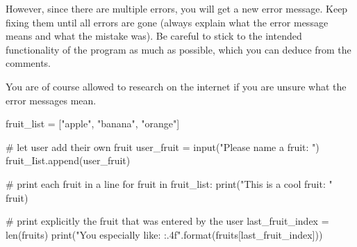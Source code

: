 \noindent However, since there are multiple errors, you will get a new error message. Keep fixing them until all errors are gone (always explain what the error message means and what the mistake was). Be careful to stick to the intended functionality of the program as much as possible, which you can deduce from the comments.

\vspace{1em}

\noindent You are of course allowed to research on the internet if you are unsure what the error messages mean.

\begin{pythoncode}
fruit_list = ["apple", "banana", "orange"]

# let user add their own fruit
user_fruit = input("Please name a fruit: ")
fruit_Iist.append(user_fruit)

# print each fruit in a line
for fruit in fruit_list:
    print("This is a cool fruit: " fruit)

# print explicitly the fruit that was entered by the user
last_fruit_index = len(fruits)
print("You especially like: {:.4f}".format(fruits[last_fruit_index]))
\end{pythoncode}


